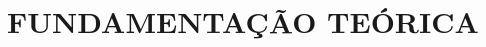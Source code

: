 \chapter[FUNDAMENTAÇÃO TEÓRICA]{\textbf {FUNDAMENTAÇÃO TEÓRICA}}











\begin{comment}

\end{comment}
